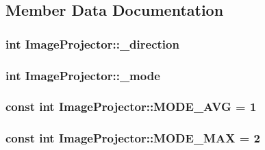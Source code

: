 \subsection{Member Data Documentation}
\hypertarget{class_image_projector_a64c6fd5a87cef8bd941a84f45781fd1c}{
\subsubsection[{\+\_\+direction}]{\setlength{\rightskip}{0pt plus 5cm}int Image\+Projector\+::\+\_\+direction\hspace{0.3cm}{\ttfamily [protected]}}}\label{class_image_projector_a64c6fd5a87cef8bd941a84f45781fd1c}
\hypertarget{class_image_projector_ad23f3f3d0f5b2a66f07d543ec09a321e}{
\subsubsection[{\+\_\+mode}]{\setlength{\rightskip}{0pt plus 5cm}int Image\+Projector\+::\+\_\+mode\hspace{0.3cm}{\ttfamily [protected]}}}\label{class_image_projector_ad23f3f3d0f5b2a66f07d543ec09a321e}
\hypertarget{class_image_projector_a1f021faf00677be6e1bafdbf1f308ae2}{
\subsubsection[{M\+O\+D\+E\+\_\+\+A\+V\+G}]{\setlength{\rightskip}{0pt plus 5cm}const int Image\+Projector\+::\+M\+O\+D\+E\+\_\+\+A\+V\+G = 1\hspace{0.3cm}{\ttfamily [static]}}}\label{class_image_projector_a1f021faf00677be6e1bafdbf1f308ae2}
\hypertarget{class_image_projector_a7b0d00775b3caaa86260c7e16771ef8d}{
\subsubsection[{M\+O\+D\+E\+\_\+\+M\+A\+X}]{\setlength{\rightskip}{0pt plus 5cm}const int Image\+Projector\+::\+M\+O\+D\+E\+\_\+\+M\+A\+X = 2\hspace{0.3cm}{\ttfamily [static]}}}\label{class_image_projector_a7b0d00775b3caaa86260c7e16771ef8d}
